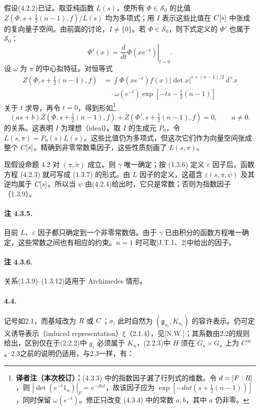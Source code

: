 假设(4.2.2)已证。取亚纯函数 $L(s)$，使所有 $\Phi\in\mathcal S_0$ 的比值 $Z(\Phi,s+\tfrac12(n-1),f)/L(s)$ 均为多项式；用 $I$ 表示这些比值在 $C[s]$ 中张成的复向量子空间。由前面的讨论，$I\ne\{0\}$。若 $\Phi\in\mathcal S_0$，则下式定义的 $\Phi'$ 也属于 $\mathcal S_0$：
\[
 \Phi'(x)=\left.\frac d{dt}\Phi(xe^{-t})\right|_{t=0}.\tag{4.3.2}
\]
设 $\omega$ 为 $\pi$ 的中心拟特征。对恒等式
\begin{equation}
\begin{split}
 Z(\Phi,s+\tfrac12(n-1),f)
 &=\int\Phi(xe^{-t})f(x)|\det x|^{s+(n-1)/2}\,d^\times x\\
 &\quad\cdot\omega(e^{-t})\exp[-ts-\tfrac t2(n-1)]
\end{split}\tag{4.3.3}
\end{equation}
关于 $t$ 求导，再令 $t=0$，得到形如\footnote{\textbf{译者注（本次校订）：}(4.3.3) 中的指数因子漏了行列式的维数。令 $d=[F:R]$，则 $|\det(e^{-t}1_n)|_F=e^{-dnt}$，故该因子应为 $\exp[-dnt(s+\tfrac12(n-1))]$，同时保留 $\omega(e^{-t})$。修正只改变 (4.3.4) 中的常数 $a,b$，其中 $a$ 仍非零。}
\[
 (as+b)Z(\Phi,s+\tfrac12(n-1),f)
 +Z(\Phi',s+\tfrac12(n-1),f)=0,\qquad a\ne0.\tag{4.3.4}
\]
的关系。这表明 $I$ 为理想（ideal）。取 $I$ 的生成元 $P_0$，令 $L(s,\pi)=P_0(s)L(s)$。这些比值仍为多项式，但这次它们作为向量空间张成整个 $C[s]$。精确到非零常数乘因子，这些性质刻画了 $L(s,\pi)$。

现假设命题 4.2 对 $(\pi,\widetilde\pi)$ 成立。则 $\gamma$ 唯一确定；按 (1.3.6) 定义 $\varepsilon$ 因子后，函数方程 (4.2.3) 就可写成 (1.3.7) 的形式。由 $L$ 因子的定义，这蕴含 $\varepsilon(s,\pi,\psi)$ 及其逆均属于 $C[s]$。所以当 $\psi$ 由(4.2.4)给出时，它只是常数；否则为指数因子（1.3.9）。

\paragraph*{注 4.3.5.}
目前 $L$、$\varepsilon$ 因子都只确定到一个非零常数倍。由于 $\gamma$ 已由积分的函数方程唯一确定，这些常数之间也有相应的约束。$n=1$ 时可取[J.T.1、2]中给出的因子。
\paragraph*{注 4.3.6.}
关系(1.3.9)--(1.3.12)适用于 Archimedes 情形。

\paragraph*{4.4.}
记号如2.1，而基域改为 $R$ 或 $C$；$\sigma_i$ 此时自然为 $(\mathfrak g_{n_i},K_{n_i})$ 的容许表示。仍可定义诱导表示（induced representation）$\xi$（2.1.4），见[N.W.]；其系数由2.2的规则给出，区别仅在于(2.2.2)中 $g_i$ 必须属于 $K_n$，(2.2.3)中 $H$ 须在 $G_n\times G_n$ 上为 $C^\infty$。2.3之前的说明仍适用，与2.3一样，有：

